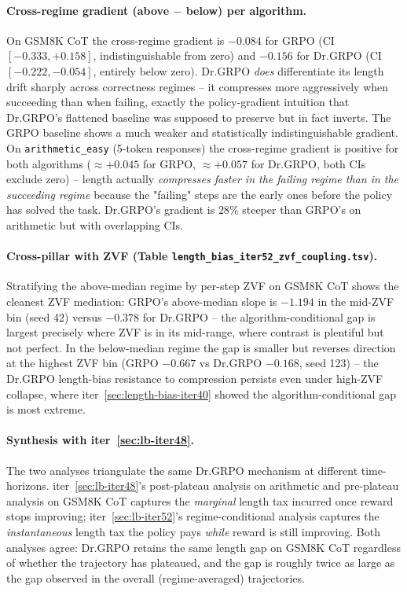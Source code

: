 \documentclass{article}
\begin{document}
\paragraph{Cross-regime gradient (above $-$ below) per algorithm.}
On GSM8K CoT the cross-regime gradient is $-0.084$ for GRPO (CI
$[-0.333, +0.158]$, indistinguishable from zero) and $-0.156$ for
Dr.GRPO (CI $[-0.222, -0.054]$, entirely below zero). Dr.GRPO
\emph{does} differentiate its length drift sharply across correctness
regimes -- it compresses more aggressively when succeeding than when
failing, exactly the policy-gradient intuition that Dr.GRPO's flattened
baseline was supposed to preserve but in fact inverts. The GRPO baseline
shows a much weaker and statistically indistinguishable gradient.
On \texttt{arithmetic\_easy} (5-token responses) the cross-regime
gradient is positive for both algorithms ($\approx +0.045$ for GRPO,
$\approx +0.057$ for Dr.GRPO, both CIs exclude zero) -- length actually
\emph{compresses faster in the failing regime than in the succeeding
regime} because the "failing" steps are the early ones before the
policy has solved the task. Dr.GRPO's gradient is $28\%$ steeper than
GRPO's on arithmetic but with overlapping CIs.

\paragraph{Cross-pillar with ZVF (Table \texttt{length\_bias\_iter52\_zvf\_coupling.tsv}).}
Stratifying the above-median regime by per-step ZVF on GSM8K CoT shows
the cleanest ZVF mediation: GRPO's above-median slope is $-1.194$ in
the mid-ZVF bin (seed 42) versus $-0.378$ for Dr.GRPO -- the
algorithm-conditional gap is largest precisely where ZVF is in its
mid-range, where contrast is plentiful but not perfect. In the
below-median regime the gap is smaller but reverses direction at the
highest ZVF bin (GRPO $-0.667$ vs Dr.GRPO $-0.168$, seed 123) -- the
Dr.GRPO length-bias resistance to compression persists even under
high-ZVF collapse, where iter~\ref{sec:length-bias-iter40} showed the
algorithm-conditional gap is most extreme.

\paragraph{Synthesis with iter~\ref{sec:lb-iter48}.}
The two analyses triangulate the same Dr.GRPO mechanism at different
time-horizons. iter~\ref{sec:lb-iter48}'s post-plateau analysis on
arithmetic and pre-plateau analysis on GSM8K CoT captures the
\emph{marginal} length tax incurred once reward stops improving;
iter~\ref{sec:lb-iter52}'s regime-conditional analysis captures the
\emph{instantaneous} length tax the policy pays \emph{while} reward is
still improving. Both analyses agree: Dr.GRPO retains the same length
gap on GSM8K CoT regardless of whether the trajectory has plateaued,
and the gap is roughly twice as large as the gap observed in the
overall (regime-averaged) trajectories.
\end{document}
